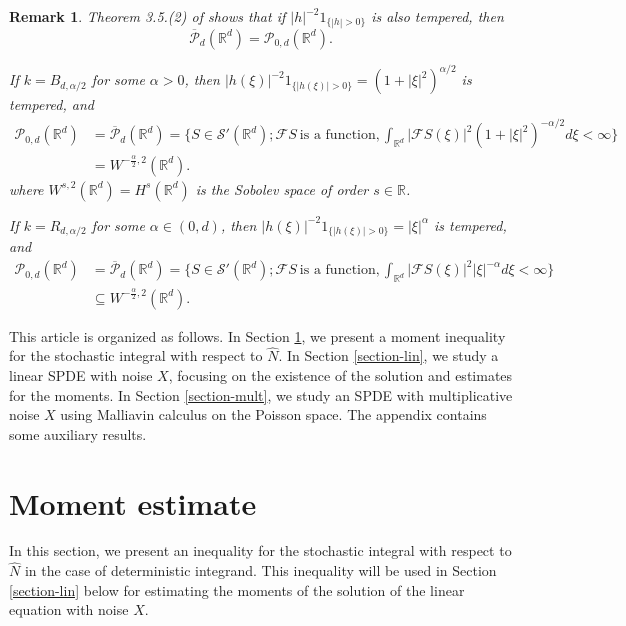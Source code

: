 \documentclass[12pt]{article}
\newtheorem{remark}[theorem]{Remark}
\def\cF{\mathcal{F}}
\def\cP{\mathcal{P}}
\def\cS{\mathcal{S}}
\def\bR{\mathbb{R}}
\begin{document}
\begin{remark}
{\rm
Theorem 3.5.(2) of \cite{BGP12} shows that if $|h|^{-2}1_{\{|h|>0\}}$ is also tempered, then
\[
\overline{\cP}_d(\bR^d) = \cP_{0,d}(\bR^d).
\] 

If $k=B_{d,\alpha/2}$ for some $\alpha>0$, then $|h(\xi)|^{-2}1_{\{|h(\xi)|>0\}}=(1+|\xi|^2)^{\alpha/2}$ is tempered, and
\begin{align*}
\cP_{0,d}(\bR^d)&=\overline{\cP}_d(\bR^d)
=\{S \in \cS'(\bR^d); \cF S \ \mbox{is a function}, \int_{\bR^d}|\cF S(\xi)|^2 (1+|\xi|^2)^{-\alpha/2}d\xi<\infty \}\\
&=W^{-\frac{\alpha}{2},2}(\bR^d).
\end{align*}
where $W^{s,2}(\bR^d)=H^{s}(\bR^d)$ is the Sobolev space of order $s\in \bR$. 


If $k=R_{d,\alpha/2}$ for some $\alpha\in (0,d)$, then $|h(\xi)|^{-2}1_{\{|h(\xi)|>0\}}=|\xi|^{\alpha}$ is tempered, and
\begin{align*}
\cP_{0,d}(\bR^d)&=\overline{\cP}_d(\bR^d)
=\{S \in \cS'(\bR^d); \cF S \ \mbox{is a function}, \int_{\bR^d}|\cF S(\xi)|^2 |\xi|^{-\alpha}d\xi<\infty \}\\
& \subseteq W^{-\frac{\alpha}{2},2}(\bR^d).
\end{align*}
}
\end{remark}


\medskip

This article is organized as follows. In Section \ref{section-mom}, we present a moment inequality for the stochastic integral with respect to $\widehat{N}$. In Section \ref{section-lin}, we study a linear SPDE with noise $X$, focusing on the existence of the solution and estimates for the moments. In Section \ref{section-mult}, we study an SPDE with multiplicative noise $X$ using Malliavin calculus on the Poisson space. The appendix contains some auxiliary results.






\section{Moment estimate}
\label{section-mom}

In this section, we present an inequality for the stochastic integral with respect to $\widehat{N}$ in the case of deterministic integrand. This inequality will be used in Section \ref{section-lin} below for estimating the moments of the solution of the linear equation with noise $X$.
\end{document}

